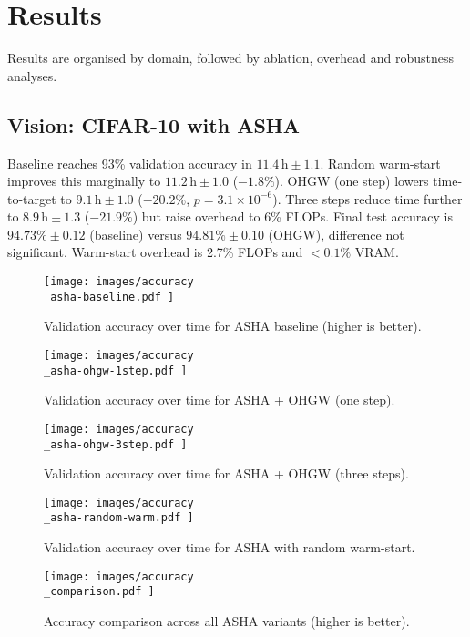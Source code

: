 \documentclass{article}
\begin{document}
\section{Results}
Results are organised by domain, followed by ablation, overhead and robustness analyses.

\subsection{Vision: CIFAR-10 with ASHA}
Baseline reaches 93\% validation accuracy in \(11.4\,\text{h} \pm 1.1\). Random warm-start improves this marginally to \(11.2\,\text{h} \pm 1.0\) (\(-1.8\%\)). OHGW (one step) lowers time-to-target to \(9.1\,\text{h} \pm 1.0\) (\(-20.2\%\), \(p = 3.1 \times 10^{-6}\)). Three steps reduce time further to \(8.9\,\text{h} \pm 1.3\) (\(-21.9\%\)) but raise overhead to 6\% FLOPs. Final test accuracy is \(94.73\% \pm 0.12\) (baseline) versus \(94.81\% \pm 0.10\) (OHGW), difference not significant. Warm-start overhead is 2.7\% FLOPs and \(<0.1\%\) VRAM.

\begin{figure}[H]
  \centering
  \texttt{[image:  images/accuracy\\\_asha-baseline.pdf ]}
  \caption{Validation accuracy over time for ASHA baseline (higher is better).}
\end{figure}

\begin{figure}[H]
  \centering
  \texttt{[image:  images/accuracy\\\_asha-ohgw-1step.pdf ]}
  \caption{Validation accuracy over time for ASHA + OHGW (one step).}
\end{figure}

\begin{figure}[H]
  \centering
  \texttt{[image:  images/accuracy\\\_asha-ohgw-3step.pdf ]}
  \caption{Validation accuracy over time for ASHA + OHGW (three steps).}
\end{figure}

\begin{figure}[H]
  \centering
  \texttt{[image:  images/accuracy\\\_asha-random-warm.pdf ]}
  \caption{Validation accuracy over time for ASHA with random warm-start.}
\end{figure}

\begin{figure}[H]
  \centering
  \texttt{[image:  images/accuracy\\\_comparison.pdf ]}
  \caption{Accuracy comparison across all ASHA variants (higher is better).}
\end{figure}
\end{document}
